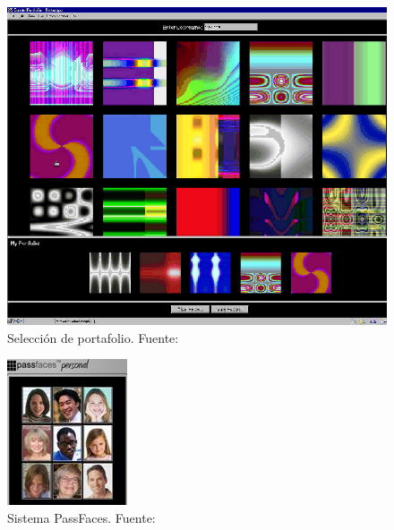 \begin{anexos}
	\begin{figure}[H]
		\centering
		\includegraphics[width=0.5\linewidth]{Deja-Vu.jpg}
		\caption{Selección de portafolio. Fuente: \cite{dhamija2000deja}}
		\label{figure:deja-vu}
	\end{figure}


\begin{figure}[H]
	\centering
	\includegraphics[width=0.3\linewidth]{3.jpg}
	\caption{Sistema PassFaces. Fuente: \cite{inproceedings}}
	\label{passfaces}
\end{figure}


\end{anexos}
